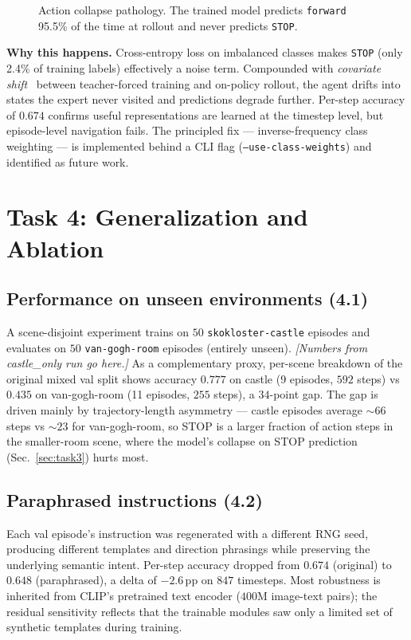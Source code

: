 \documentclass[10pt, twocolumn]{article}
\begin{document}
\begin{figure}[ht]\centering
\caption{Action collapse pathology. The trained model predicts
\texttt{forward} 95.5\% of the time at rollout and never predicts
\texttt{STOP}.}
\label{fig:collapse}
\end{figure}

\textbf{Why this happens.} Cross-entropy loss on imbalanced classes makes
\texttt{STOP} (only 2.4\% of training labels) effectively a noise term.
Compounded with \emph{covariate shift}~\cite{ross2010efficient} between
teacher-forced training and on-policy rollout, the agent drifts into
states the expert never visited and predictions degrade further.
Per-step accuracy of $0.674$ confirms useful representations are learned
at the timestep level, but episode-level navigation fails. The
principled fix --- inverse-frequency class weighting --- is implemented
behind a CLI flag (\texttt{--use-class-weights}) and identified as
future work.

\section{Task 4: Generalization and Ablation}\label{sec:task4}

\subsection{Performance on unseen environments (4.1)}
A scene-disjoint experiment trains on $50$ \texttt{skokloster-castle}
episodes and evaluates on $50$ \texttt{van-gogh-room} episodes (entirely
unseen). \emph{[Numbers from castle\_only run go here.]} As a
complementary proxy, per-scene breakdown of the original mixed val split
shows accuracy $0.777$ on castle (9 episodes, $592$ steps) vs $0.435$ on
van-gogh-room (11 episodes, $255$ steps), a $34$-point gap. The gap is
driven mainly by trajectory-length asymmetry --- castle episodes average
$\sim\!66$ steps vs $\sim\!23$ for van-gogh-room, so STOP is a larger
fraction of action steps in the smaller-room scene, where the model's
collapse on STOP prediction (Sec.~\ref{sec:task3}) hurts most.

\subsection{Paraphrased instructions (4.2)}
Each val episode's instruction was regenerated with a different RNG seed,
producing different templates and direction phrasings while preserving
the underlying semantic intent. Per-step accuracy dropped from $0.674$
(original) to $0.648$ (paraphrased), a delta of $\mathbf{-2.6}$\,pp on
$847$ timesteps. Most robustness is inherited from CLIP's pretrained text
encoder ($400$M image-text pairs); the residual sensitivity reflects
that the trainable modules saw only a limited set of synthetic templates
during training.
\end{document}
